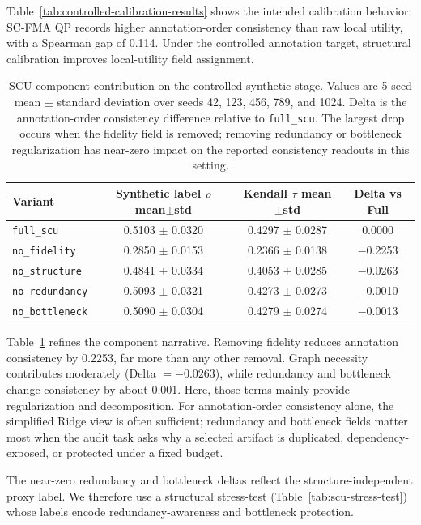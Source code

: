 \documentclass[pdflatex,sn-mathphys-num,iicol]{sn-jnl}
\begin{document}
Table~\ref{tab:controlled-calibration-results} shows the intended calibration behavior: SC-FMA QP records higher annotation-order consistency than raw local utility, with a Spearman gap of 0.114. Under the controlled annotation target, structural calibration improves local-utility field assignment.

\begin{table}[ht]
\caption{SCU component contribution on the controlled synthetic stage. Values are 5-seed mean $\pm$ standard deviation over seeds 42, 123, 456, 789, and 1024. Delta is the annotation-order consistency difference relative to \texttt{full\_scu}. The largest drop occurs when the fidelity field is removed; removing redundancy or bottleneck regularization has near-zero impact on the reported consistency readouts in this setting.}
\label{tab:scu-component-contribution}
\centering
\small
\renewcommand{\arraystretch}{1.08}
\begin{tabular}{lccc}
\toprule
\textbf{Variant} & \textbf{Synthetic label $\rho$ mean$\pm$std} & \textbf{Kendall $\tau$ mean$\pm$std} & \textbf{Delta vs Full} \\
\midrule
\texttt{full\_scu} & 0.5103 $\pm$ 0.0320 & 0.4297 $\pm$ 0.0287 & 0.0000 \\
\texttt{no\_fidelity} & 0.2850 $\pm$ 0.0153 & 0.2366 $\pm$ 0.0138 & $-$0.2253 \\
\texttt{no\_structure} & 0.4841 $\pm$ 0.0334 & 0.4053 $\pm$ 0.0285 & $-$0.0263 \\
\texttt{no\_redundancy} & 0.5093 $\pm$ 0.0321 & 0.4273 $\pm$ 0.0273 & $-$0.0010 \\
\texttt{no\_bottleneck} & 0.5090 $\pm$ 0.0304 & 0.4279 $\pm$ 0.0274 & $-$0.0013 \\
\bottomrule
\end{tabular}
\end{table}

Table~\ref{tab:scu-component-contribution} refines the component narrative. Removing fidelity reduces annotation consistency by 0.2253, far more than any other removal. Graph necessity contributes moderately (Delta $=-0.0263$), while redundancy and bottleneck change consistency by about 0.001. Here, those terms mainly provide regularization and decomposition. For annotation-order consistency alone, the simplified Ridge view is often sufficient; redundancy and bottleneck fields matter most when the audit task asks why a selected artifact is duplicated, dependency-exposed, or protected under a fixed budget.

The near-zero redundancy and bottleneck deltas reflect the structure-independent proxy label. We therefore use a structural stress-test (Table~\ref{tab:scu-stress-test}) whose labels encode redundancy-awareness and bottleneck protection.
\end{document}
